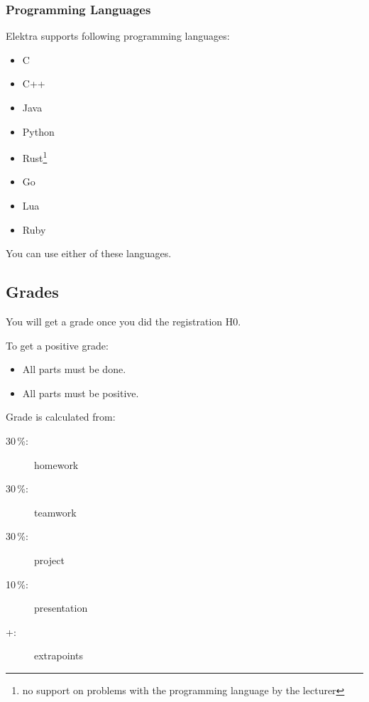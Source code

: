 \begin{frame}
	\frametitle{Programming Languages}
	Elektra supports following programming languages:
	\begin{itemize}
		\item C
		\item C++
		\item Java
		\item Python
		\item Rust\footnote{no support on problems with the programming language by the lecturer}
		\item Go\footnotemark[1]
		\item Lua\footnotemark[1]
		\item Ruby\footnotemark[1]
	\end{itemize}
	You can use either of these languages.
\end{frame}

\subsection{Grades}

\begin{frame}
	You will get a grade once you did the registration H0.
	\vspace{1cm}

	To get a positive grade:
	\begin{itemize}
		\item All parts must be done.
		\item All parts must be positive.
	\end{itemize}
\end{frame}

\begin{frame}
	Grade is calculated from:
	\begin{description}
	\item[30\,\%:] homework
	\item[30\,\%:] teamwork
	\item[30\,\%:] project
	\item[10\,\%:] presentation
	\item[+:] extrapoints
	\end{description}
\end{frame}

